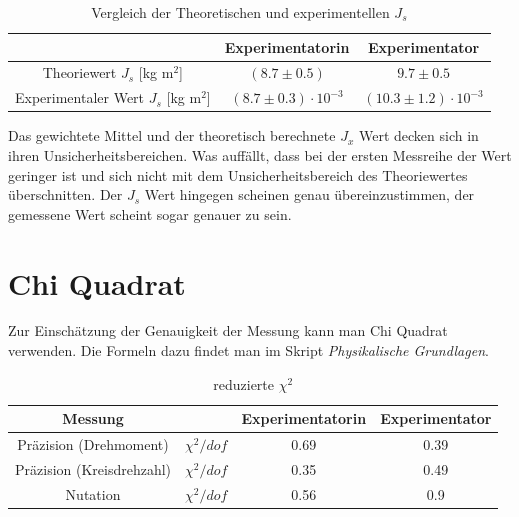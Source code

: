 \documentclass[bibliography=totocnumbered]{scrartcl}
\begin{document}
	\begin{table}[ht!]
		\centering
		\caption[Vergleich]{Vergleich der Theoretischen und experimentellen $ J_{s} $}
		\begin{tabular}{|c|c|c|}
			\hline
			& Experimentatorin & Experimentator \\
			\hline
			Theoriewert $ J_{s} $ [kg m$ ^{2} $] & $ (8.7 \pm 0.5) $ & $ 9.7\pm0.5 $ \\
			\hline
			Experimentaler Wert $ J_{s} $ [kg m$ ^{2} $] & $(8.7 \pm0.3 )\cdot 10^{-3}$ & $(10.3 \pm1.2)\cdot 10^{-3} $  \\
			\hline
		\end{tabular}
		\label{tab: Vergleich}
	\end{table}
	
	
	
	Das gewichtete Mittel und der theoretisch berechnete $ J_{x} $ Wert decken sich in ihren Unsicherheitsbereichen. Was auffällt, dass bei der ersten Messreihe der Wert geringer ist und sich nicht mit dem Unsicherheitsbereich des Theoriewertes überschnitten.
	Der $ J_{s} $ Wert hingegen scheinen genau übereinzustimmen, der gemessene Wert scheint sogar genauer zu sein.
	
	
	\newpage
	\section{Chi Quadrat}
	Zur Einschätzung der Genauigkeit der Messung kann man Chi Quadrat verwenden. Die Formeln dazu
	findet man im Skript \textit{Physikalische Grundlagen}\smartcite{MullerPG.2007b}.
	
	\begin{table}[ht!]
		\centering
		\caption{reduzierte $ \chi^{2} $}
		\begin{tabular}{|c|c|c|c|}
			\hline
		Messung	& & Experimentatorin  & Experimentator \\
			\hline
		Präzision (Drehmoment)& 	$ \chi^{2}/dof $& 0.69 &0.39  \\
			\hline
			Präzision (Kreisdrehzahl)& 	$ \chi^{2}/dof $& 0.35 & 0.49 \\
			\hline
			Nutation& 	$ \chi^{2}/dof $& 0.56  & 0.9 \\
			\hline
		\end{tabular}
		\label{tab: chi quadrat}
	\end{table}
\end{document}
